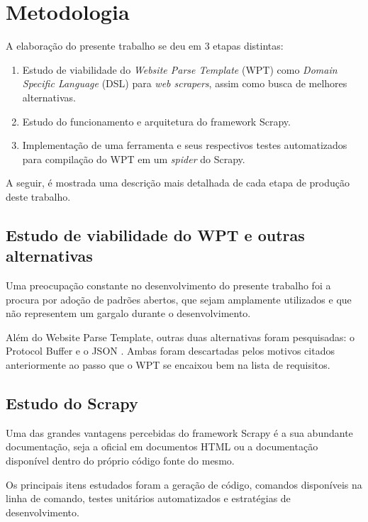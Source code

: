 \chapter{Metodologia}
\thispagestyle{fancy}

A elaboração do presente trabalho se deu em 3 etapas distintas:

\begin{enumerate}
	\item Estudo de viabilidade do \emph{Website Parse Template} (WPT) como \emph{Domain Specific Language} (DSL) para \emph{web scrapers}, assim como busca de melhores alternativas.
	\item Estudo do funcionamento e arquitetura do framework Scrapy.
	\item Implementação de uma ferramenta e seus respectivos testes automatizados para compilação do WPT em um \emph{spider} do Scrapy.
\end{enumerate}

A seguir, é mostrada uma descrição mais detalhada de cada etapa de produção deste trabalho.

\section{Estudo de viabilidade do WPT e outras alternativas}

Uma preocupação constante no desenvolvimento do presente trabalho foi a procura por adoção de padrões abertos, que sejam amplamente utilizados e que não representem um gargalo durante o desenvolvimento.

Além do Website Parse Template, outras duas alternativas foram pesquisadas: o Protocol Buffer \cite{protobuf} e o JSON \cite{JSON}. Ambas foram descartadas pelos motivos citados anteriormente ao passo que o WPT se encaixou bem na lista de requisitos.

\section{Estudo do Scrapy}

Uma das grandes vantagens percebidas do framework Scrapy é a sua abundante documentação, seja a oficial em documentos HTML ou a documentação disponível dentro do próprio código fonte do mesmo.

Os principais itens estudados foram a geração de código, comandos disponíveis na linha de comando, testes unitários automatizados e estratégias de desenvolvimento.

